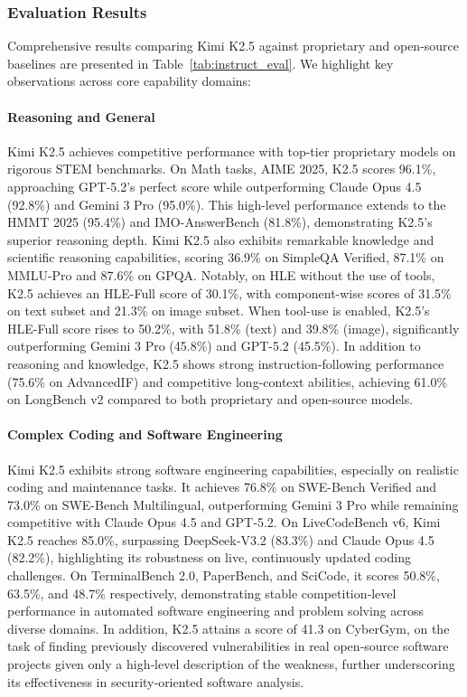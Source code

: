 \documentclass{article}
\begin{document}
\subsubsection{Evaluation Results}
\label{sec:eval_results}
Comprehensive results comparing Kimi K2.5 against proprietary and open-source baselines are presented in Table~\ref{tab:instruct_eval}. We highlight key observations across core capability domains:
\paragraph{Reasoning and General}
Kimi K2.5 achieves competitive performance with top-tier proprietary models on rigorous STEM benchmarks. On Math tasks, AIME 2025, K2.5 scores 96.1\%, approaching GPT-5.2's perfect score while outperforming Claude Opus 4.5 (92.8\%) and Gemini 3 Pro (95.0\%). This high-level performance extends to the HMMT 2025 (95.4\%) and IMO-AnswerBench (81.8\%), demonstrating K2.5's superior reasoning depth. Kimi K2.5 also exhibits remarkable knowledge and scientific reasoning capabilities, scoring 36.9\% on SimpleQA Verified, 87.1\% on MMLU-Pro and 87.6\% on GPQA. Notably, on HLE without the use of tools, K2.5 achieves an HLE-Full score of 30.1\%, with component-wise scores of 31.5\% on text subset and 21.3\% on image subset. When tool-use is enabled, K2.5’s HLE-Full score rises to 50.2\%, with 51.8\% (text) and 39.8\% (image), significantly outperforming Gemini 3 Pro (45.8\%) and GPT-5.2 (45.5\%). In addition to reasoning and knowledge, K2.5 shows strong instruction-following performance (75.6\% on AdvancedIF) and competitive long-context abilities, achieving 61.0\% on LongBench v2 compared to both proprietary and open-source models.

\paragraph{Complex Coding and Software Engineering}
Kimi K2.5 exhibits strong software engineering capabilities, especially on realistic coding and maintenance tasks. It achieves 76.8\% on SWE-Bench Verified and 73.0\% on SWE-Bench Multilingual, outperforming Gemini 3 Pro while remaining competitive with Claude Opus 4.5 and GPT‑5.2. On LiveCodeBench v6, Kimi K2.5 reaches 85.0\%, surpassing DeepSeek‑V3.2 (83.3\%) and Claude Opus 4.5 (82.2\%), highlighting its robustness on live, continuously updated coding challenges. On TerminalBench 2.0, PaperBench, and SciCode, it scores 50.8\%, 63.5\%, and 48.7\% respectively, demonstrating stable competition‑level performance in automated software engineering and problem solving across diverse domains. In addition, K2.5 attains a score of 41.3 on CyberGym, on the task of finding previously discovered vulnerabilities in real open‑source software projects given only a high‑level description of the weakness, further underscoring its effectiveness in security‑oriented software analysis.
\end{document}
